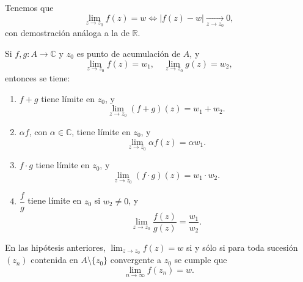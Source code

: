 Tenemos que 
\[
\lim_{z \to z_0} f(z) = w \iff |f(z) - w| \xrightarrow[z \to z_0]{} 0,
\]
con demostración análoga a la de $\mathbb{R}$.

\begin{proposición}
    Si $f, g : A \to \mathbb{C}$ y $z_0$ es punto de acumulación de $A$, y
    \[
    \lim_{z \to z_0} f(z) = w_1, 
    \quad \lim_{z \to z_0} g(z) = w_2,
    \]
    entonces se tiene:    
    \begin{enumerate}
        \item $f+g$ tiene límite en $z_0$, y
        \[
        \lim_{z \to z_0} (f+g)(z) = w_1 + w_2.
        \]
        \item $\alpha f$, con $\alpha \in \mathbb{C}$, tiene límite en $z_0$, y
        \[
        \lim_{z \to z_0} \alpha f(z) = \alpha w_1.
        \]
        \item $f \cdot g$ tiene límite en $z_0$, y
        \[
        \lim_{z \to z_0} (f \cdot g)(z) = w_1 \cdot w_2.
        \]
        \item $\dfrac{f}{g}$ tiene límite en $z_0$ si $w_2 \neq 0$, y
        \[
        \lim_{z \to z_0} \frac{f(z)}{g(z)} = \frac{w_1}{w_2}.
        \]
    \end{enumerate}
\end{proposición}


En las hipótesis anteriores, $\lim_{z \to z_0} f(z) = w$ si y sólo si para toda sucesión $(z_n)$ contenida en $A \setminus \{z_0\}$ convergente a $z_0$ se cumple que 
\[
\lim_{n \to \infty} f(z_n) = w.
\]


